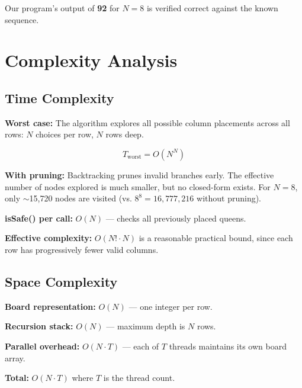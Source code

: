 \documentclass[11pt]{article}
\begin{document}
Our program's output of \textbf{92} for $N = 8$ is verified correct against the known sequence.

\newpage

\section{Complexity Analysis}

\subsection{Time Complexity}

\begin{shadedbox}
\textbf{Worst case:} The algorithm explores all possible column placements across all rows: $N$ choices per row, $N$ rows deep.

$$T_{\text{worst}} = O(N^N)$$

\textbf{With pruning:} Backtracking prunes invalid branches early. The effective number of nodes explored is much smaller, but no closed-form exists. For $N = 8$, only $\sim$15,720 nodes are visited (vs. $8^8 = 16,777,216$ without pruning).

\vspace{4pt}
\textbf{isSafe() per call:} $O(N)$ --- checks all previously placed queens.

\vspace{4pt}
\textbf{Effective complexity:} $O(N! \cdot N)$ is a reasonable practical bound, since each row has progressively fewer valid columns.
\end{shadedbox}

\subsection{Space Complexity}

\begin{shadedbox}
\textbf{Board representation:} $O(N)$ --- one integer per row.

\vspace{4pt}
\textbf{Recursion stack:} $O(N)$ --- maximum depth is $N$ rows.

\vspace{4pt}
\textbf{Parallel overhead:} $O(N \cdot T)$ --- each of $T$ threads maintains its own board array.

\vspace{4pt}
\textbf{Total:} $O(N \cdot T)$ where $T$ is the thread count.
\end{shadedbox}
\end{document}
